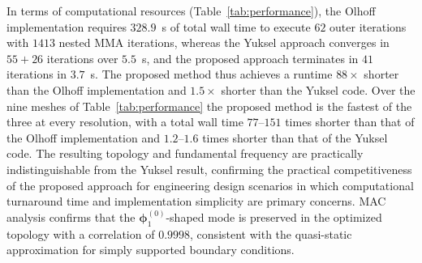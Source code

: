\documentclass[applsci,article,submit,pdftex,moreauthors]{Definitions/mdpi}
\begin{document}
In terms of computational resources (Table~\ref{tab:performance}), the Olhoff implementation requires $328.9$~s of total wall time to execute $62$ outer iterations with $1413$ nested MMA iterations, whereas the Yuksel approach converges in $55 + 26$ iterations over $5.5$~s, and the proposed approach terminates in $41$ iterations in $3.7$~s. The proposed method thus achieves a runtime $88\times$ shorter than the Olhoff implementation and $1.5\times$ shorter than the Yuksel code. Over the nine meshes of Table~\ref{tab:performance} the proposed method is the fastest of the three at every resolution, with a total wall time $77$--$151$ times shorter than that of the Olhoff implementation and $1.2$--$1.6$ times shorter than that of the Yuksel code. The resulting topology and fundamental frequency are practically indistinguishable from the Yuksel result, confirming the practical competitiveness of the proposed approach for engineering design scenarios in which computational turnaround time and implementation simplicity are primary concerns. MAC analysis confirms that the $\boldsymbol{\phi}_1^{(0)}$-shaped mode is preserved in the optimized topology with a correlation of $0.9998$, consistent with the quasi-static approximation for simply supported boundary conditions.
\end{document}
